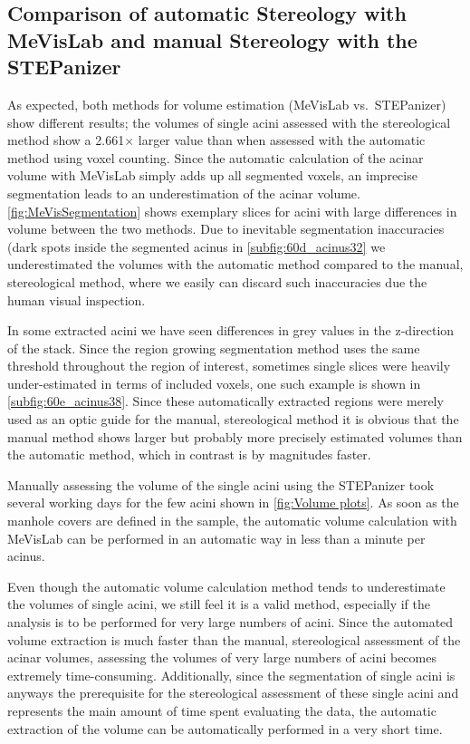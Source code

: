 \documentclass[a4paper,DIVcalc,abstract,english]{scrartcl}
\newcommand{\difference}{2.661} %
\begin{document}
\subsection[Comparison of MeVisLab with STEPanizer]{Comparison of automatic Stereology with MeVisLab and manual Stereology with the STEPanizer}
As expected, both methods for volume estimation (MeVisLab vs.\ STEPanizer) show different results; the volumes of single acini assessed with the stereological method show a \difference\(\times\) larger value than when assessed with the automatic method using voxel counting.
Since the automatic calculation of the acinar volume with MeVisLab simply adds up all segmented voxels, an imprecise segmentation leads to an underestimation of the acinar volume.
\autoref{fig:MeVisSegmentation} shows exemplary slices for acini with large differences in volume between the two methods.
Due to inevitable segmentation inaccuracies (dark spots inside the segmented acinus in \autoref{subfig:60d_acinus32} we underestimated the volumes with the automatic method compared to the manual, stereological method, where we easily can discard such inaccuracies due the human visual inspection.

In some extracted acini we have seen differences in grey values in the z-direction of the stack.
Since the region growing segmentation method uses the same threshold throughout the region of interest, sometimes single slices were heavily under-estimated in terms of included voxels, one such example is shown in \autoref{subfig:60e_acinus38}.
Since these automatically extracted regions were merely used as an optic guide for the manual, stereological method it is obvious that the manual method shows larger but probably more precisely estimated volumes than the automatic method, which in contrast is by magnitudes faster.

Manually assessing the volume of the single acini using the STEPanizer took several working days for the few acini shown in \autoref{fig:Volume plots}.
As soon as the manhole covers are defined in the sample, the automatic volume calculation with MeVisLab can be performed in an automatic way in less than a minute per acinus.

Even though the automatic volume calculation method tends to underestimate the volumes of single acini, we still feel it is a valid method, especially if the analysis is to be performed for very large numbers of acini. Since the automated volume extraction is much faster than the manual, stereological assessment of the acinar volumes, assessing the volumes of very large numbers of acini becomes extremely time-consuming.
Additionally, since the segmentation of single acini is anyways the prerequisite for the stereological assessment of these single acini and represents the main amount of time spent evaluating the data, the automatic extraction of the volume can be automatically performed in a very short time.
\end{document}
